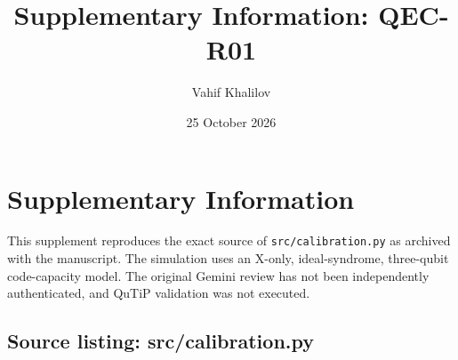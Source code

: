 \documentclass[10pt,a4paper,landscape]{article}
\title{Supplementary Information: QEC-R01}\author{Vahif Khalilov}
\date{25 October 2026}
\begin{document}
\maketitle
\section{Supplementary Information}
This supplement reproduces the exact source of \texttt{src/calibration.py} as archived with the manuscript. The simulation uses an X-only, ideal-syndrome, three-qubit code-capacity model. The original Gemini review has not been independently authenticated, and QuTiP validation was not executed.

\subsection*{Source listing: src/calibration.py}
\begingroup\tiny
\end{document}
